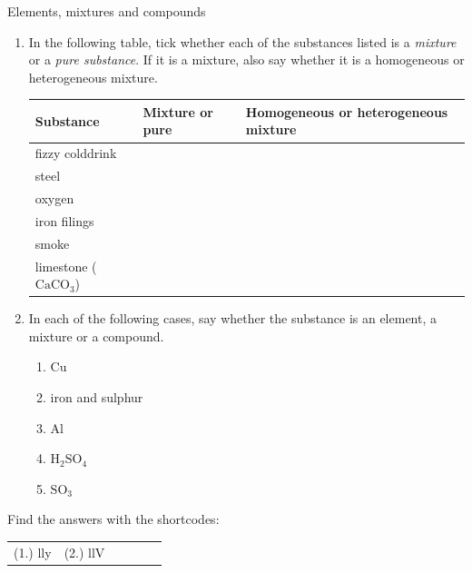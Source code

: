             \begin{exercises}{Elements, mixtures and compounds}{
            \nopagebreak \noindent
            \label{m38708*id63472}
 \begin{enumerate}[noitemsep, label=\textbf{\arabic*}. ] 
    \item In the following table, tick whether each of the substances listed is a \textsl{mixture} or a \textsl{pure substance}. If it is a mixture, also say whether it is a homogeneous or heterogeneous mixture.
          \begin{table}[H]
        \begin{center}
    \noindent
      \begin{tabular}{|l|l|l|}\hline
        \textbf{Substance} &
        \textbf{Mixture or pure} &
        \textbf{Homogeneous or heterogeneous mixture} \\ \hline
        fizzy colddrink & & \\ \hline
        steel & & \\ \hline
        oxygen & & \\ \hline
        iron filings & & \\ \hline
        smoke & & \\ \hline
        limestone (${\text{CaCO}}_{3}$) & & \\ \hline
    \end{tabular}
      \end{center}
\end{table}

\label{m38708*uid29}\item In each of the following cases, say whether the substance is an element, a mixture or a compound.
\begin{enumerate}[noitemsep, label=\textbf{\alph*}. ] 
\item $\text{Cu}$
\item iron and sulphur
\item $\text{Al}$
\item $\text{H}_{2}\text{SO}_{4}$
\item $\text{SO}_{3}$
\end{enumerate}
                \end{enumerate}
\practiceinfo
\par {} Find the answers with the shortcodes:
 \par \begin{tabular}[h]{cccccc}
 (1.) lly  &  (2.) llV  & \end{tabular}
}
\end{exercises}
